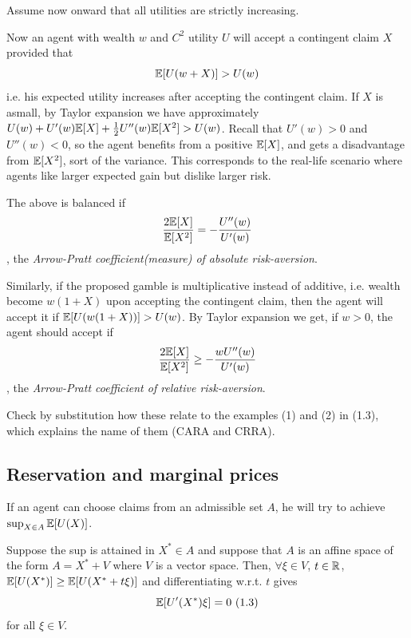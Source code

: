 \documentclass[a4paper]{article}
\begin{document}
Assume now onward that all utilities are strictly increasing.

Now an agent with wealth $w$ and $C^2$ utility $U$ will accept a contingent claim $X$ provided that $$\mathbb{E}[U(w+X)] > U(w)$$ i.e. his expected utility increases after accepting the contingent claim. If $X$ is asmall, by Taylor expansion we have approximately $U(w) + U'(w) \mathbb{E}[X] + \frac{1}{2} U''(w) \mathbb{E}[X^2] > U(w)$. Recall that $U'(w) > 0$ and $U''(w) < 0$, so the agent benefits from a positive $\mathbb{E}[X]$, and gets a disadvantage from $\mathbb{E}[X^2]$, sort of the variance. This corresponds to the real-life scenario where agents like larger expected gain but dislike larger risk.

The above is balanced if $$\frac{2\mathbb{E}[X]}{\mathbb{E}[X^2]} = -\frac{U''(w)}{U'(w)}$$, the \emph{Arrow-Pratt coefficient(measure) of absolute risk-aversion}.

Similarly, if the proposed gamble is multiplicative instead of additive, i.e. wealth become $w(1+X)$ upon accepting the contingent claim, then the agent will accept it if $\mathbb{E}[U(w(1+X))] > U(w)$. By Taylor expansion we get, if $w>0$, the agent should accept if $$\frac{2\mathbb{E}[X]}{\mathbb{E}[X^2]} \geq -\frac{wU''(w)}{U'(w)}$$, the \emph{Arrow-Pratt coefficient of relative risk-aversion}.

Check by substitution how these relate to the examples (1) and (2) in (1.3), which explains the name of them (CARA and CRRA).

\subsection{Reservation and marginal prices}
If an agent can choose claims from an admissible set $A$, he will try to achieve $\sup_{X \in A} \mathbb{E}[U(X)]$.

Suppose the sup is attained in $X^* \in A$ and suppose that $A$ is an affine space of the form $A = X^* + V$ where $V$ is a vector space. Then, $\forall \xi \in V$, $t \in \mathbb{R}$, $\mathbb{E}[U(X^*)] \geq \mathbb{E}[U(X^*+t\xi)]$ and differentiating w.r.t. $t$ gives $$ \mathbb{E}[U'(X^*) \xi] =0 \ (1.3)$$ for all $\xi \in V$.

\end{document}
